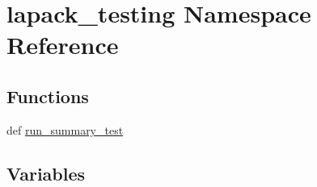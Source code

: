 \hypertarget{namespacelapack__testing}{}\section{lapack\+\_\+testing Namespace Reference}
\label{namespacelapack__testing}
\subsection*{Functions}
\begin{DoxyCompactItemize}
\item 
def \hyperlink{namespacelapack__testing_a4760940b3874f918b5db7fb30d11bee1}{run\+\_\+summary\+\_\+test}
\end{DoxyCompactItemize}
\subsection*{Variables}

